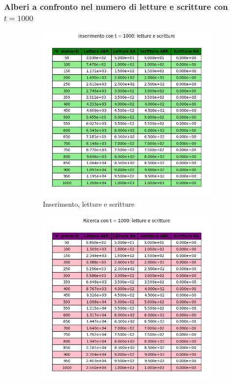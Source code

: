 \subsubsection{Alberi a confronto nel numero di letture e scritture con $t = 1000$}

\begin{figure}[H]
    \centering
    \begin{subfigure}[b]{0.49\textwidth}
        \centering
        \includegraphics[width=\textwidth]{tables/insert-wr-t1000.png}
        \caption{Inserimento, letture e scritture}
        \label{fig:tableinsertwr1000}
    \end{subfigure}
    \hfill
    \begin{subfigure}[b]{0.49\textwidth}
        \centering
        \includegraphics[width=\textwidth]{tables/search-wr-t1000.png}

\end{subfigure}
\end{figure}
